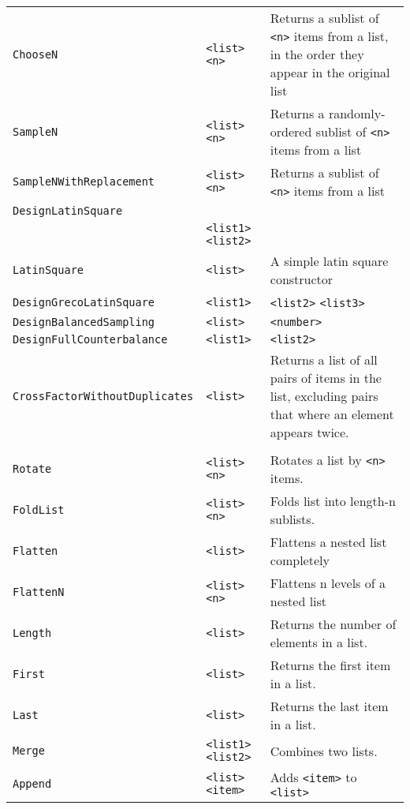 \begin{longtable}{p{3cm}p{3cm}p{6cm}}
\verb+ChooseN+ & \verb+<list>+ \verb+<n>+ & Returns a sublist of \verb+<n>+ items from a 
list, in the order they appear in the original list\\ 
\verb+SampleN+ & \verb+<list>+ \verb+<n>+ & Returns a randomly-ordered sublist of \verb+<n>+ items from a list\\ 
\verb+SampleNWithReplacement+ &\hspace{1.5cm} \verb+<list>+ \verb+<n>+& Returns a sublist of \verb+<n>+ items from a list \\ 
\verb+DesignLatinSquare+\\
  &\verb+<list1>+ \verb+<list2>+ & \\ 
\verb+LatinSquare+ &\verb+<list>+& A simple latin square constructor\\ 
\verb+DesignGrecoLatinSquare+ &\hspace{1.5cm}\verb+<list1>+ &\verb+<list2>+ \verb+<list3>+ \\ 
\verb+DesignBalancedSampling+ &\hspace{1.5cm}\verb+<list>+ & \verb+<number>+ \\ 
\verb+DesignFullCounterbalance+ &\hspace{1.5cm}\verb+<list1>+ &\verb+<list2>+ \\ 
\verb+CrossFactorWithoutDuplicates+ &\hspace{1.8cm}\verb+<list>+ & Returns a list of all pairs of items in the list, excluding pairs that where an element appears twice. \\ 
& & \\ 
\verb+Rotate+ &\verb+<list>+ \verb+<n>+ & Rotates a list by \verb+<n>+ items.\\ 
\verb+FoldList+ &\verb+<list>+ \verb+<n>+ & Folds list into length-n sublists.\\ 
\verb+Flatten+ &\verb+<list>+ & Flattens a nested list completely\\ 
\verb+FlattenN+ &\verb+<list>+ \verb+<n>+ & Flattens n levels of a nested list\\ 
\verb+Length+ &\verb+<list>+ & Returns the number of elements in a list.\\ 
\verb+First+ &\verb+<list>+ & Returns the first item in a list. \\ 
\verb+Last+ &\verb+<list>+ & Returns the last item in a list.\\ 
\verb+Merge+ &\verb+<list1>+ \verb+<list2>+& Combines two lists.\\ 
\verb+Append+ &\verb+<list>+ \verb+<item>+ & Adds \verb+<item>+ to \verb+<list>+ \\ 

\end{longtable}
